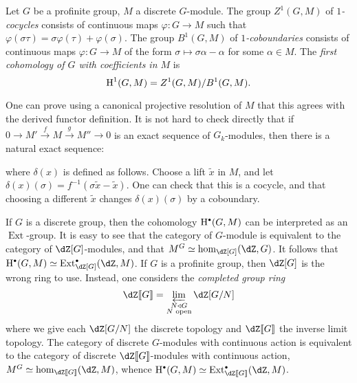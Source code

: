 \begin{definition}
Let $G$ be a profinite group, $M$ a discrete $G$-module. The group $Z^1(G,M)$ 
of \emph{$1$-cocycles} consists of continuous maps $\varphi:G\to M$ such that 
$\varphi(\sigma\tau)=\sigma\varphi(\tau)+\varphi(\sigma)$. The group $B^1(G,M)$ 
of \emph{$1$-coboundaries} consists of continuous maps $\varphi:G\to M$ of the 
form $\sigma\mapsto \sigma\alpha-\alpha$ for some $\alpha\in M$. The 
\emph{first cohomology of $G$ with coefficients in $M$} is 
\[
  \operatorname{H}^1(G,M) = Z^1(G,M) / B^1(G,M) \text{.}
\]
\end{definition}
One can prove using a canonical projective resolution of $M$ that this agrees 
with the derived functor definition. It is not hard to  check directly that if 
$0\to M'\xrightarrow f M\xrightarrow g M'' \to 0$ is an exact sequence of 
$G_k$-modules, then there is a natural exact sequence:
\begin{center}
\end{center}
where $\delta(x)$ is defined as follows. Choose a lift $\tilde x$ in 
$M$, and let $\delta(x)(\sigma) = f^{-1}(\sigma \tilde x - \tilde x)$. One can 
check that this is a cocycle, and that choosing a different $\tilde x$ changes 
$\delta(x)(\sigma)$ by a coboundary. 

If $G$ is a discrete group, then the cohomology $\h^\bullet(G,M)$ can be 
interpreted as an $\operatorname{Ext}$-group. It is easy to see that the 
category of $G$-module is equivalent to the category of $\dZ[G]$-modules, and 
that $M^G\simeq \hom_{\dZ[G]}(\dZ,G)$. It follows that 
$\h^\bullet(G,M)\simeq \operatorname{Ext}_{\dZ[G]}^\bullet(\dZ,M)$. If $G$ is a 
profinite group, then $\dZ[G]$ is the wrong ring to use. Instead, one considers 
the \emph{completed group ring} 
\[
  \dZ\llbracket G\rrbracket = \varprojlim_{\substack{N\triangleleft G \\ N\text{ open}}} \dZ[G/N]
\]
where we give each $\dZ[G/N]$ the discrete topology and 
$\dZ\llbracket G\rrbracket$ the inverse limit topology. The category of 
discrete $G$-modules with continuous action is equivalent to the category of 
discrete $\dZ\llbracket G\rrbracket$-modules with continuous action, 
$M^G\simeq \hom_{\dZ\llbracket G\rrbracket}(\dZ,M)$, whence 
$\h^\bullet(G,M) \simeq \operatorname{Ext}_{\dZ\llbracket G\rrbracket}^\bullet(\dZ,M)$. 

